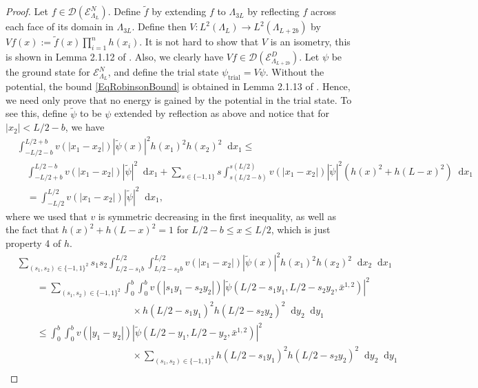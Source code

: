 \documentclass[a4paper,11pt]{article}
\newcommand{\abs}[1]{\left\lvert #1 \right\rvert}
\newcommand*\diff{\mathop{}\!\mathrm{d}}
\numberwithin{equation}{section}
\begin{document}
\begin{proof}
		
		Let $ f\in \mathcal{D}(\mathcal{E}^N_{\Lambda_L}) $. Define $ \tilde{f} $ by extending $ f $ to $ \Lambda_{3L} $ by reflecting $ f $ across each face of its domain in $ \Lambda_{3L} $. Define then $ V:L^2(\Lambda_L)\to L^2(\Lambda_{L+2b})  $ by $ Vf(x):=\tilde{f}(x)\prod_{i=1}^{n}h(x_i) $. It is not hard to show that $ V $ is an isometry, this is shown in Lemma 2.1.12 of \cite{robinson2014thermodynamic}. Also, we clearly have $ Vf\in \mathcal{D}(\mathcal{E}^D_{\Lambda_{L+2b}})  $.  Let $ \psi $ be the ground state for $ \mathcal{E}^N_{\Lambda_L} $, and define the trial state $ \psi_{\text{trial}}=V\psi $. Without the potential, the bound \eqref{EqRobinsonBound} is obtained in Lemma 2.1.13 of \cite{robinson2014thermodynamic}. Hence, we need only prove that no energy is gained by the potential in the trial state. To see this, define $ \tilde{\psi} $ to be $ \psi $ extended by reflection as above and notice that for $ \abs{x_2}<L/2-b $, we have \begin{equation}
		\begin{aligned}
		&\int_{-L/2-b}^{L/2+b}v(\abs{x_1-x_2})\abs{\tilde{\psi}(x)}^2h(x_1)^2h(x_2)^2\diff x_1\leq\\&\quad  \int_{-L/2+b}^{L/2-b}v(\abs{x_1-x_2})\abs{\tilde{\psi}}^2\diff x_1+\sum_{s\in\{-1,1\}}s\int_{s(L/2-b)}^{s(L/2)}v(\abs{x_1-x_2})\abs{\tilde{\psi}}^2(h(x)^2+h(L-x)^2)\diff x_1\\
		&\quad =\int_{-L/2}^{L/2}v(\abs{x_1-x_2})\abs{\tilde{\psi}}^2\diff x_1,
		\end{aligned}
		\end{equation}
		where we used that $ v $ is symmetric decreasing in the first inequality, as well as the fact that $ h(x)^2+h(L-x)^2=1 $ for $ L/2-b\leq x\leq L/2 $, which is just property 4 of $h$.
		\begin{equation}
		\begin{aligned}
		&\sum_{(s_1,s_2)\in\{-1,1\}^2}s_1s_2\int_{L/2-s_1b}^{L/2}\int_{L/2-s_2b}^{L/2}v(\abs{x_1-x_2})\abs{\tilde{\psi}(x)}^2h(x_1)^2h(x_2)^2\diff x_2\diff x_1\\
		&\quad\quad =\sum_{(s_1,s_2)\in\{-1,1\}^2}\int_{0}^{b}\int_{0}^{b}v(\abs{s_1y_1-s_2y_2})\abs{\tilde{\psi}(L/2-s_1 y_1,L/2-s_2 y_2,\bar{x}^{1,2})}^2\\&\hspace{5cm}\times h(L/2-s_1 y_1)^2h(L/2-s_2 y_2)^2\diff y_2\diff y_1\\
		&\quad\quad\leq \int_{0}^{b}\int_{0}^{b}v(\abs{y_1-y_2})\abs{\tilde{\psi}(L/2-y_1,L/2- y_2,\bar{x}^{1,2})}^2\\&\hspace{5cm}\times\sum_{(s_1,s_2)\in\{-1,1\}^2}h(L/2-s_1 y_1)^2h(L/2-s_2 y_2)^2\diff y_2\diff y_1\\

\end{aligned}
\end{equation}
\end{proof}
\end{document}
